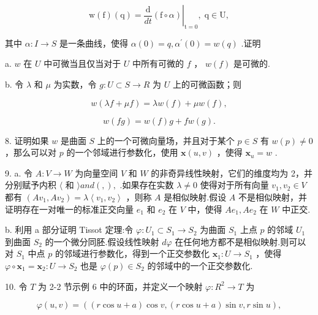 \[
\mathrm{w}\left( \mathrm{f}\right) \left( \mathrm{q}\right)  = {\left. \frac{\mathrm{d}}{dt}\left( \mathrm{f} \circ  \alpha \right) \right| }_{\mathrm{t} = 0},\;\mathrm{q} \in  \mathrm{U},
\]

其中 \(\alpha  : I \rightarrow  S\) 是一条曲线，使得 \(\alpha \left( 0\right)  = q,{\alpha }^{\prime }\left( 0\right)  = w\left( q\right)\) .证明

a. \(w\) 在 \(U\) 中可微当且仅当对于 \(U\) 中所有可微的 \(f\) ， \(w\left( f\right)\) 是可微的.

b. 令 \(\lambda\) 和 \(\mu\) 为实数，令 \(g : U \subset  S \rightarrow  R\) 为 \(U\) 上的可微函数；则

\[
w\left( {{\lambda f} + {\mu f}}\right)  = {\lambda w}\left( f\right)  + {\mu w}\left( f\right) ,
\]

\[
w\left( {fg}\right)  = w\left( f\right) g + {fw}\left( g\right) .
\]

8. 证明如果 \(w\) 是曲面 \(S\) 上的一个可微向量场，并且对于某个 \(p \in  S\) 有 \(w\left( p\right)  \neq  0\) ，那么可以对 \(p\) 的一个邻域进行参数化，使用 \(\mathbf{x}\left( {u,v}\right)\) ，使得 \({\mathbf{x}}_{u} = w\) .

9. a. 令 \(A : V \rightarrow  W\) 为向量空间 \(V\) 和 \(W\) 的非奇异线性映射，它们的维度均为 2，并分别赋予内积 \(\langle\) 和 \(\rangle {and}\left( ,\right) ,\) .如果存在实数 \(\lambda  \neq  0\) 使得对于所有向量 \({v}_{1},{v}_{2} \in  V\) 都有 \(\left( {A{v}_{1},A{v}_{2}}\right)  = \lambda \left\langle  {{v}_{1},{v}_{2}}\right\rangle\) ，则称 \(A\) 是相似映射.假设 \(A\) 不是相似映射，并证明存在一对唯一的标准正交向量 \({e}_{1}\) 和 \({e}_{2}\) 在 \(V\) 中，使得 \(A{e}_{1},A{e}_{2}\) 在 \(W\) 中正交.

b. 利用 a 部分证明 Tissot 定理:令 \(\varphi  : {U}_{1} \subset  {S}_{1} \rightarrow  {S}_{2}\) 为曲面 \({S}_{1}\) 上点 \(p\) 的邻域 \({U}_{1}\) 到曲面 \({S}_{2}\) 的一个微分同胚.假设线性映射 \({d\varphi }\) 在任何地方都不是相似映射.则可以对 \({S}_{1}\) 中点 \(p\) 的邻域进行参数化，得到一个正交参数化 \({\mathbf{x}}_{1} : U \rightarrow  {S}_{1}\) ，使得 \(\varphi  \circ  {\mathbf{x}}_{1} = {\mathbf{x}}_{2} : U \rightarrow  {S}_{2}\) 也是 \(\varphi \left( p\right)  \in  {S}_{2}\) 的邻域中的一个正交参数化.

10. 令 \(T\) 为 2-2 节示例 6 中的环面，并定义一个映射 \(\varphi  : {R}^{2} \rightarrow  T\) 为

\[
\varphi \left( {u,v}\right)  = \left( {\left( {r\cos u + a}\right) \cos v,\left( {r\cos u + a}\right) \sin v,r\sin u}\right) ,
\]

